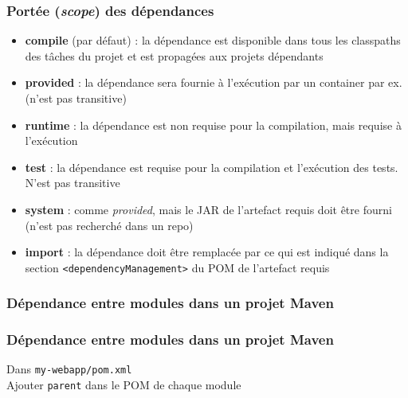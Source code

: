 \documentclass{beamer}
\begin{document}
\begin{frame}[fragile]
  \frametitle{Portée (\textit{scope}) des dépendances}
  \begin{itemize}
  \item \textbf{compile} (par défaut) : la dépendance est disponible dans
    tous les classpaths des tâches du projet et est propagées aux projets
    dépendants
  \item \textbf{provided} : la dépendance sera fournie à l'exécution par un container par ex. (n'est pas transitive)
  \item \textbf{runtime} : la dépendance est non requise pour la compilation, mais requise à l'exécution
  \item \textbf{test} : la dépendance est requise pour la compilation et
    l'exécution des tests. N'est pas transitive
  \item \textbf{system} : comme \textit{provided}, mais le JAR de
    l'artefact requis doit être fourni (n'est pas recherché dans un
    repo)
  \item \textbf{import} : la dépendance doit être remplacée par ce qui
    est indiqué dans la section \texttt{<dependencyManagement>} du
    POM de l'artefact requis
  \end{itemize}
\end{frame}

\begin{frame}[fragile]
  \frametitle{Dépendance entre modules dans un projet Maven}
\end{frame}

\begin{frame}[fragile]
  \frametitle{Dépendance entre modules dans un projet Maven}
  \begin{flushleft}
    Dans \texttt{my-webapp/pom.xml}    \\
    \vspace{1.5cm}
    Ajouter \texttt{parent} dans le POM de chaque module
    \vspace{2.5cm}
  \end{flushleft}
\end{frame}
\end{document}
